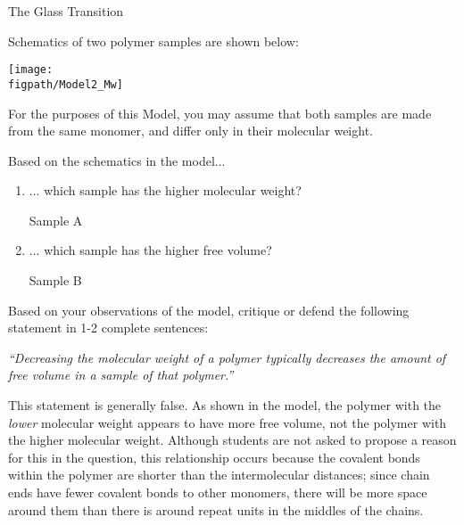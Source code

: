 \begin{activity}{The Glass Transition}
\begin{ctqs}
\begin{solution}[1.5in]
				\end{solution}
	
\end{ctqs}

\begin{model}
\label{\labelbase:mdl:chainends}
	
	Schematics of two polymer samples are shown below:
	
	\vspace{6pt}
	\centerline{\texttt{[image: \\figpath/Model2\_Mw]}}
	
	For the purposes of this Model, you may assume that both samples are made from the same monomer, and differ only in their molecular weight.
	
\end{model}

\begin{ctqs}

	\question Based on the schematics in the model...
		\begin{enumerate}
			\item ... which sample has the higher molecular weight?
				
				\begin{solution}[0.25in]
					Sample A
				\end{solution}
				
			\item ... which sample has the higher free volume?
				
				\begin{solution}[0.25in]
					Sample B
				\end{solution}
				
		\end{enumerate}
		
	\question Based on your observations of the model, critique or defend the following statement in 1-2 complete sentences:
	
		\emph{``Decreasing the molecular weight of a polymer typically decreases the amount of free volume in a sample of that polymer.''}
		
		\begin{solution}[1.5in]
			This statement is generally false.  As shown in the model, the polymer with the \emph{lower} molecular weight appears to have more free volume, not the polymer with the higher molecular weight.  Although students are not asked to propose a reason for this in the question, this relationship occurs because the covalent bonds within the polymer are shorter than the intermolecular distances; since chain ends have fewer covalent bonds to other monomers, there will be more space around them than there is around repeat units in the middles of the chains.
		\end{solution}
	

\end{ctqs}
\end{activity}
